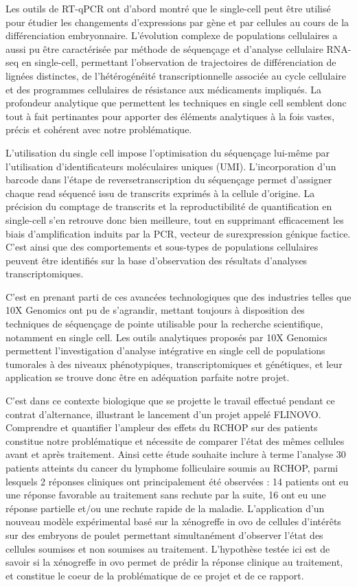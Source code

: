 \documentclass[12pt]{report}
\begin{document}
Les outils de RT-qPCR ont d'abord montré que le single-cell peut être utilisé pour étudier les changements d’expressions par gène et par cellules au cours de la différenciation embryonnaire\cite{Richard}.
L'évolution complexe de populations cellulaires a aussi pu être caractérisée par méthode de séquençage et d’analyse cellulaire RNA-seq en single-cell, permettant l'observation de trajectoires de différenciation de lignées distinctes, 
de l’hétérogénéité transcriptionnelle associée au cycle cellulaire et des programmes cellulaires de résistance aux médicaments impliqués\cite{Hwang}\cite{Tirosh}.
La profondeur analytique que permettent les techniques en single cell semblent donc tout à fait pertinantes pour apporter des éléments analytiques à la fois vastes, précis et cohérent avec notre problématique.

L'utilisation du single cell impose l'optimisation du séquençage lui-même par l'utilisation d'identificateurs moléculaires uniques (UMI). 
L’incorporation d’un barcode dans l’étape de reversetranscription du séquençage permet d'assigner chaque read séquencé issu de transcrits exprimés à la cellule d’origine.  
La précision du comptage de transcrits et la reproductibilité de quantification en single-cell s'en retrouve donc bien meilleure, tout en supprimant efficacement les biais d'amplification induits par la PCR, vecteur de surexpression génique factice\cite{Hwang}.
C’est ainsi que des comportements et sous-types de populations cellulaires peuvent être identifiés sur la base d’observation des résultats d’analyses transcriptomiques.\cite{Tirosh}\cite{Li}

C'est en prenant parti de ces avancées technologiques que des industries telles que 10X Genomics ont pu de s'agrandir, mettant toujours à disposition des techniques de séquençage de pointe utilisable pour la recherche scientifique, notamment en single cell. 
Les outils analytiques proposés par 10X Genomics permettent l'investigation d'analyse intégrative en single cell de populations tumorales à des niveaux phénotypiques, transcriptomiques et génétiques, 
et leur application se trouve donc être en adéquation parfaite notre projet.

C’est dans ce contexte biologique que se projette le travail effectué pendant ce contrat d'alternance, illustrant le lancement d'un projet appelé FLINOVO. 
Comprendre et quantifier l'ampleur des effets du RCHOP sur des patients constitue notre problématique et nécessite de comparer l'état des mêmes cellules avant et après traitement.
Ainsi cette étude souhaite inclure à terme l'analyse 30 patients atteints du cancer du lymphome folliculaire soumis au RCHOP, parmi lesquels 2 réponses cliniques ont principalement été observées : 
14 patients ont eu une réponse favorable au traitement sans rechute par la suite, 16 ont eu une réponse partielle et/ou une rechute rapide de la maladie.
L'application d'un nouveau modèle expérimental basé sur la xénogreffe in ovo de cellules d'intérêts sur des embryons de poulet permettant simultanément d'observer l'état des cellules soumises et non soumises au traitement.
L'hypothèse testée ici est de savoir si la xénogreffe in ovo permet de prédir la réponse clinique au traitement, et constitue le coeur de la problématique de ce projet et de ce rapport. 
\end{document}
